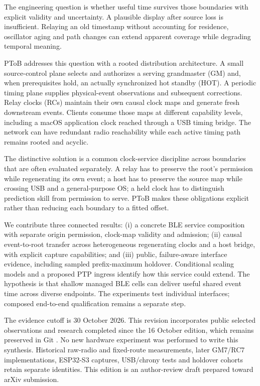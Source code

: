 \documentclass[11pt,letterpaper]{article}
\begin{document}
The engineering question is whether useful time survives those boundaries with explicit validity and uncertainty. A plausible display after source loss is insufficient. Relaying an old timestamp without accounting for residence, oscillator aging and path changes can extend apparent coverage while degrading temporal meaning.

PToB addresses this question with a rooted distribution architecture. A small source-control plane selects and authorizes a serving grandmaster (GM) and, when prerequisites hold, an actually synchronized hot standby (HOT). A periodic timing plane supplies physical-event observations and subsequent corrections. Relay clocks (RCs) maintain their own causal clock maps and generate fresh downstream events. Clients consume those maps at different capability levels, including a macOS application clock reached through a USB timing bridge. The network can have redundant radio reachability while each active timing path remains rooted and acyclic.

The distinctive solution is a common clock-service discipline across boundaries that are often evaluated separately. A relay has to preserve the root's permission while regenerating its own event; a host has to preserve the source map while crossing USB and a general-purpose OS; a held clock has to distinguish prediction skill from permission to serve. PToB makes these obligations explicit rather than reducing each boundary to a fitted offset.

We contribute three connected results: (i) a concrete BLE service composition with separate origin permission, clock-map validity and admission; (ii) causal event-to-root transfer across heterogeneous regenerating clocks and a host bridge, with explicit capture capabilities; and (iii) public, failure-aware interface evidence, including sampled prefix-maximum holdover. Conditional scaling models and a proposed PTP ingress identify how this service could extend. The hypothesis is that shallow managed BLE cells can deliver useful shared event time across diverse endpoints. The experiments test individual interfaces; composed end-to-end qualification remains a separate step.

The evidence cutoff is 30 October 2026. This revision incorporates public selected observations and research completed since the 16 October edition, which remains preserved in Git \cite{legacy}. No new hardware experiment was performed to write this synthesis. Historical raw-radio and fixed-route measurements, later GM7/RC7 implementations, ESP32-S3 captures, USB/chrony tests and holdover cohorts retain separate identities. This edition is an author-review draft prepared toward arXiv submission.
\end{document}
